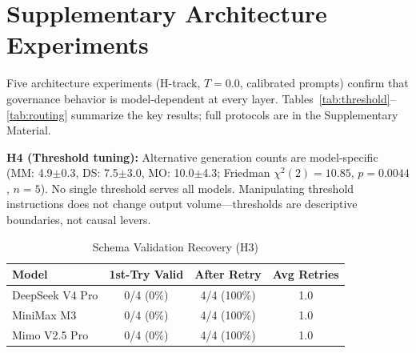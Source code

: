 \documentclass[11pt,a4paper]{article}
\begin{document}
\section{Supplementary Architecture Experiments}\label{sec:arch-experiments}

Five architecture experiments (H-track, $T=0.0$, calibrated prompts) confirm that governance behavior is model-dependent at every layer. Tables~\ref{tab:threshold}--\ref{tab:routing} summarize the key results; full protocols are in the Supplementary Material.

\begin{table}[htbp]\centering\caption{Threshold Pass Rates (H4)}\label{tab:threshold}\small
{}
\end{table}

\textbf{H4 (Threshold tuning):} Alternative generation counts are model-specific (MM: 4.9$\pm$0.3, DS: 7.5$\pm$3.0, MO: 10.0$\pm$4.3; Friedman $\chi^2(2)=10.85$, $p=0.0044$, $n=5$). No single threshold serves all models. Manipulating threshold instructions does not change output volume---thresholds are descriptive boundaries, not causal levers.

\begin{table}[htbp]\centering\caption{Schema Validation Recovery (H3)}\small
\begin{tabular}{lccc}\toprule\textbf{Model} & \textbf{1st-Try Valid} & \textbf{After Retry} & \textbf{Avg Retries}\\\midrule
DeepSeek V4 Pro & 0/4 (0\%) & 4/4 (100\%) & 1.0\\
MiniMax M3 & 0/4 (0\%) & 4/4 (100\%) & 1.0\\
Mimo V2.5 Pro & 0/4 (0\%) & 4/4 (100\%) & 1.0\\\bottomrule
\end{tabular}
\end{table}
\end{document}
